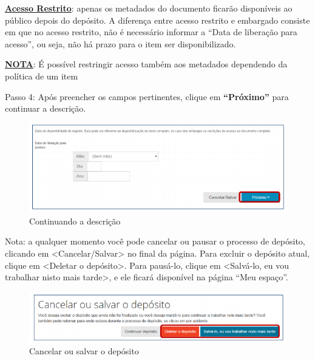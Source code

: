 \documentclass[12pt,hidelinks]{article}
\begin{document}
    \textbf{\underline{Acesso Restrito}}: apenas os metadados do documento ficarão disponíveis ao público depois do depósito. A diferença entre acesso restrito e embargado consiste em que no acesso restrito, não é necessário informar a “Data de liberação para acesso”, ou seja, não há prazo para o item ser disponibilizado.
    
    \singlespacing
    
    \textbf{\underline{NOTA}}: É possível restringir acesso também aos metadados dependendo da política de um item
    
    Passo 4: Após preencher os campos pertinentes, clique em \textbf{“Próximo”} para continuar a descrição.
    
    \begin{figure}[!htp]
                \centering
                \includegraphics[scale=0.8]{figura/Figura140.png}
                \caption{Continuando a descrição}
            \label{Rotulo}
        \end{figure}
    
\newpage
    
    Nota: a qualquer momento você pode cancelar ou pausar o processo de depósito, clicando em <Cancelar/Salvar> no final da página. Para excluir o depósito atual, clique em <Deletar o depósito>. Para pausá-lo, clique em <Salvá-lo, eu vou trabalhar nisto mais tarde>, e ele ficará disponível na página “Meu espaço”.
    
    \begin{figure}[!htp]
                \centering
                \includegraphics[scale=0.8]{figura/Figura141.png}
                \caption{Cancelar ou salvar o depósito}
            \label{Rotulo}
        \end{figure}
    
\end{document}
